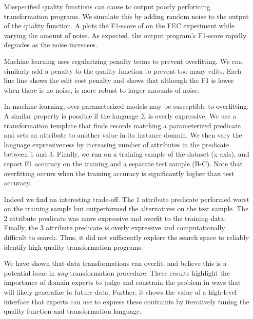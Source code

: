   Misspecified quality functions can cause \sys to output poorly performing transformation programs.  We simulate this by adding random noise to the output of the quality function. A plots the F1-score of \sys on the FEC experiment while varying the amount of noise.  As expected, the output program's F1-score rapidly degrades as the noise increases.  

Machine learning uses regularizing penalty terms to prevent overfitting.  We can similarly add a penalty to the quality function to prevent too many edits.  Each line line shows the edit cost penalty and shows that although the F1 is lower when there is no noise, \sys is more robust to larger amounts of noise. 

 In machine learning, over-parameterized models may be susceptible to overfitting.  A similar property is possible if the language $\Sigma$ is overly expressive.  We use a transformation template that finds records matching a parameterized predicate and sets an attribute to another value in its instance domain.   We then vary the language expressiveness by increasing number of attributes in the predicate between 1 and 3.  Finally, we run \sys on a training sample of the dataset (x-axis), and report F1 accuracy on the training and a separate test sample (B-C).  Note that overfitting occurs when the training accuracy is significantly higher than test accuracy.

Indeed we find an interesting trade-off.  The 1 attribute predicate performed worst on the training sample but outperformed the alternatives on the test sample.  The 2 attribute predicate was more expressive and overfit to the training data.  Finally, the 3 attribute predicate is overly expressive and computationally difficult to search.  Thus, it did not sufficiently explore the search space to reliably identify high quality transformation programs. 

 We have shown that data transformations can overfit, and believe this is a potential issue in {\it any} transformation procedure. These results highlight the importance of domain experts to judge and constrain the problem in ways that will likely generalize to future data. Further, it shows the value of a high-level interface that experts can use to express these contraints by iteratively tuning the quality function and transformation language. 

